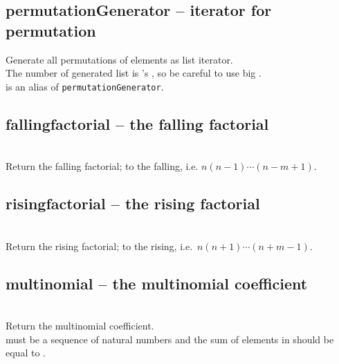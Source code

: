   \subsection{permutationGenerator -- iterator for permutation}
   \spacing
   \quad Generate all permutations of  elements as list iterator.\\
   \spacing 
   \quad The number of generated list is 's
   , so be careful to use
   big .\\
   \spacing 
   is an alias of {\tt permutationGenerator}.\\

  \subsection{fallingfactorial -- the falling factorial}
   \\
   \spacing
   \quad Return the falling factorial;  to the  falling,
   i.e. \(n(n-1)\cdots(n-m+1)\).\\

  \subsection{risingfactorial -- the rising factorial}
   \\
   \spacing
   \quad Return the rising factorial;  to the  rising,
   i.e.\, \(n(n+1)\cdots(n+m-1)\).\\

  \subsection{multinomial -- the multinomial coefficient}
   \\
   \spacing
   \quad Return the multinomial coefficient.\\
   \spacing
   \quad {} must be a sequence of natural numbers and the sum of elements in  should be equal to .\\


